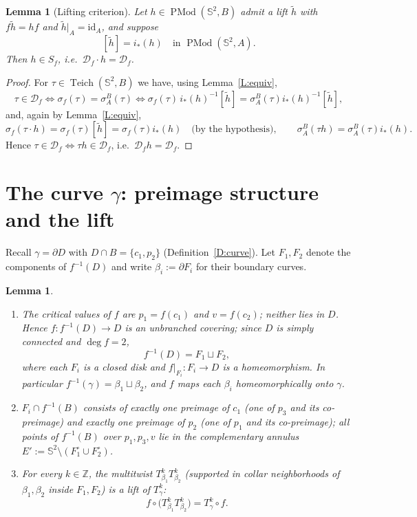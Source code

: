 \documentclass[11pt]{amsart}
\newtheorem{lemma}[theorem]{Lemma}
\newcommand{\Sph}{\mathbb{S}^{2}}
\newcommand{\Teich}{\operatorname{Teich}}
\newcommand{\PMod}{\operatorname{PMod}}
\newcommand{\Def}{\mathcal{D}}
\begin{document}
\begin{lemma}[Lifting criterion]\label{L:liftcriterion}
Let $h\in\PMod(\Sph,B)$ admit a lift $\tilde h$ with
$f\tilde h=hf$ and $\tilde h|_A=\mathrm{id}_A$, and suppose
\[
[\tilde h]=i_*(h)\quad\text{in }\PMod(\Sph,A).
\]
Then $h\in S_f$, i.e.\ $\Def_f\cdot h=\Def_f$.
\end{lemma}

\begin{proof}
For $\tau\in\Teich(\Sph,B)$ we have, using Lemma~\ref{L:equiv},
\[
\tau\in\Def_f
\iff \sigma_f(\tau)=\sigma^B_A(\tau)
\iff \sigma_f(\tau)\, i_*(h)^{-1}[\tilde h]=\sigma^B_A(\tau) i_*(h)^{-1}[\tilde h],
\]
and, again by Lemma~\ref{L:equiv},
\[
\sigma_f(\tau\cdot h)=\sigma_f(\tau)[\tilde h]
=\sigma_f(\tau)i_*(h)\quad\text{(by the hypothesis)},\qquad
\sigma^B_A(\tau h)=\sigma^B_A(\tau)i_*(h).
\]
Hence $\tau\in\Def_f\iff \tau h\in\Def_f$, i.e.\ $\Def_f h=\Def_f$.
\end{proof}

\section{The curve $\gamma$: preimage structure and the lift}\label{S:curve}

Recall $\gamma=\partial D$ with $D\cap B=\{c_1,p_2\}$
(Definition~\ref{D:curve}). Let $F_1,F_2$ denote the components of
$f^{-1}(D)$ and write $\beta_i:=\partial F_i$ for their boundary curves.

\begin{lemma}\label{L:preimage}
\begin{enumerate}
\item The critical values of $f$ are $p_1=f(c_1)$ and $v=f(c_2)$; neither
lies in $D$. Hence $f:f^{-1}(D)\to D$ is an unbranched covering; since $D$
is simply connected and $\deg f=2$,
\[
f^{-1}(D)=F_1\sqcup F_2,
\]
where each $F_i$ is a closed disk and $f|_{F_i}:F_i\to D$ is a
homeomorphism. In particular $f^{-1}(\gamma)=\beta_1\sqcup\beta_2$, and
$f$ maps each $\beta_i$ homeomorphically onto $\gamma$.
\item $F_i\cap f^{-1}(B)$ consists of exactly one preimage of $c_1$
(one of $p_3$ and its co-preimage) and exactly one preimage of $p_2$ (one
of $p_1$ and its co-preimage); all points of $f^{-1}(B)$ over
$p_1,p_3,v$ lie in the complementary annulus
$E':=\Sph\setminus(F_1^\circ\cup F_2^\circ)$.
\item For every $k\in\mathbb{Z}$, the multitwist
$T_{\beta_1}^kT_{\beta_2}^k$ (supported in collar neighborhoods of
$\beta_1,\beta_2$ inside $F_1,F_2$) is a lift of $T_\gamma^k$:
\[
f\circ\bigl(T_{\beta_1}^kT_{\beta_2}^k\bigr)=T_\gamma^k\circ f .
\]
\end{enumerate}
\end{lemma}
\end{document}
